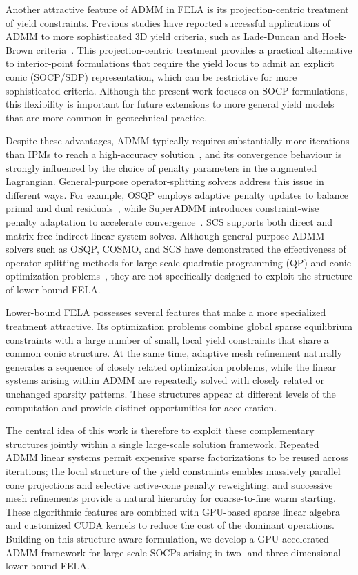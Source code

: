 Another attractive feature of ADMM in FELA is its projection-centric treatment of yield constraints. Previous studies have reported successful applications of ADMM to more sophisticated 3D yield criteria, such as Lade-Duncan and Hoek-Brown criteria~\cite{3DLD, 3DHB}. This projection-centric treatment provides a practical alternative to interior-point formulations that require the yield locus to admit an explicit conic (SOCP/SDP) representation, which can be restrictive for more sophisticated criteria. Although the present work focuses on SOCP formulations, this flexibility is important for future extensions to more general yield models that are more common in geotechnical practice.
 

Despite these advantages, ADMM typically requires substantially more iterations than IPMs to reach a high-accuracy solution~\cite{daSilva_2020, ADMM_Book}, and its convergence behaviour is strongly influenced by the choice of penalty parameters in the augmented Lagrangian. General-purpose operator-splitting solvers address this issue in different ways. For example, OSQP employs adaptive penalty updates to balance primal and dual residuals~\cite{OSQP}, while SuperADMM introduces constraint-wise penalty adaptation to accelerate convergence~\cite{SuperADMM}. SCS supports both direct and matrix-free indirect linear-system solves. Although general-purpose ADMM solvers such as OSQP, COSMO, and SCS have demonstrated the effectiveness of operator-splitting methods for large-scale quadratic programming (QP) and conic optimization problems~\cite{OSQP, COSMO, SCS}, they are not specifically designed to exploit the structure of lower-bound FELA. 

Lower-bound FELA possesses several features that make a more specialized treatment attractive. Its optimization problems combine global sparse equilibrium constraints with a large number of small, local yield constraints that share a common conic structure. At the same time, adaptive mesh refinement naturally generates a sequence of closely related optimization problems, while the linear systems arising within ADMM are repeatedly solved with closely related or unchanged sparsity patterns. These structures appear at different levels of the computation and provide distinct opportunities for acceleration.



The central idea of this work is therefore to exploit these complementary structures jointly within a single large-scale solution framework. Repeated ADMM linear systems permit expensive sparse factorizations to be reused across iterations; the local structure of the yield constraints enables massively parallel cone projections and selective active-cone penalty reweighting; and successive mesh refinements provide a natural hierarchy for coarse-to-fine warm starting. These algorithmic features are combined with GPU-based sparse linear algebra and customized CUDA kernels to reduce the cost of the dominant operations. Building on this structure-aware formulation, we develop a GPU-accelerated ADMM framework for large-scale SOCPs arising in two- and three-dimensional lower-bound FELA.

